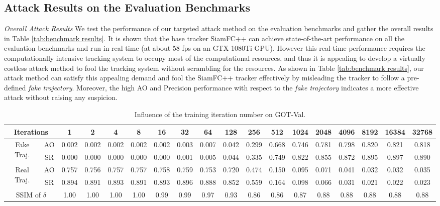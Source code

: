 \documentclass{article}
\begin{document}
\subsection{Attack Results on the Evaluation Benchmarks}

\textit{Overall Attack Results} We test the performance of our targeted attack method on the evaluation benchmarks and gather the overall results in Table \ref{tab:benchmark results}. It is shown that the base tracker SiamFC++ can achieve state-of-the-art performance on all the evaluation benchmarks and run in real time (at about 58 fps on an GTX 1080Ti GPU). However this real-time performance requires the computationally intensive tracking system to occupy most of the computational resources, and thus it is appealing to develop a virtually costless attack method to fool the tracking system without scrambling for the resources. As shown in Table \ref{tab:benchmark results}, our attack method can satisfy this appealing demand and fool the SiamFC++ tracker effectively by misleading the tracker to follow a pre-defined \textit{fake trajectory}. Moreover, the high AO and Precision performance with respect to the \textit{fake trajectory} indicates a more effective attack without raising any suspicion.

\begin{table}
\centering
\footnotesize
\tabcolsep=3.0pt
\label{tab:iter}
\begin{tabular}{cc|cccccccccccccccc} 
\toprule
\multicolumn{2}{c|}{Iterations}     & 1     & 2     & 4     & 8     & 16    & 32    & 64    & 128   & 256   & 512   & 1024  & 2048  & 4096  & 8192  & 16384 & 32768  \\ 
\midrule
\multirow{2}{*}{Fake Traj.} & AO    & 0.002 & 0.002 & 0.002 & 0.002 & 0.002 & 0.003 & 0.007 & 0.042 & 0.299 & 0.668 & 0.746 & 0.781 & 0.798 & 0.820 & 0.821 & 0.818  \\
                                 & SR    & 0.000 & 0.000 & 0.000 & 0.000 & 0.000 & 0.001 & 0.005 & 0.044 & 0.335 & 0.749 & 0.822 & 0.855 & 0.872 & 0.895 & 0.897 & 0.890  \\ 
\midrule
\multirow{2}{*}{Real Traj.} & AO    & 0.757 & 0.756 & 0.757 & 0.757 & 0.758 & 0.759 & 0.753 & 0.720 & 0.474 & 0.150 & 0.095 & 0.071 & 0.041 & 0.032 & 0.032 & 0.035  \\
                                 & SR    & 0.894 & 0.891 & 0.893 & 0.891 & 0.893 & 0.896 & 0.888 & 0.852 & 0.559 & 0.164 & 0.098 & 0.066 & 0.031 & 0.021 & 0.022 & 0.023  \\ 
\midrule
\multicolumn{2}{c|}{SSIM of $\delta$}                        & 1.00  & 1.00  & 1.00  & 1.00  & 0.99  & 0.99  & 0.97  & 0.93  & 0.86  & 0.86  & 0.87  & 0.88  & 0.88  & 0.88  & 0.88  & 0.88   \\
\bottomrule
\end{tabular}
\caption{Influence of the training iteration number on GOT-Val.}
\label{tab:iter}
\end{table}
\end{document}
